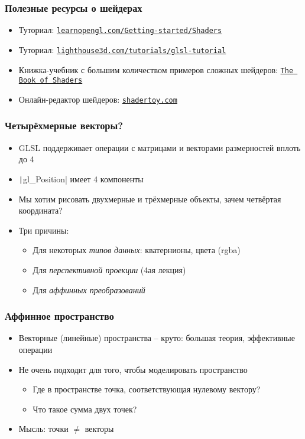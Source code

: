 \documentclass[10pt]{beamer}
\begin{document}
\begin{frame}[fragile]
\frametitle{Полезные ресурсы о шейдерах}
\begin{itemize}
\item Туториал: \href{https://learnopengl.com/Getting-started/Shaders}{\nolinkurl{learnopengl.com/Getting-started/Shaders}}
\item Туториал: \href{https://www.lighthouse3d.com/tutorials/glsl-tutorial}{\nolinkurl{lighthouse3d.com/tutorials/glsl-tutorial}}
\pause
\item Книжка-учебник с большим количеством примеров сложных шейдеров: \href{https://thebookofshaders.com/00/}{\texttt{The Book of Shaders}}
\pause
\item Онлайн-редактор шейдеров: \href{https://shadertoy.com/}{\nolinkurl{shadertoy.com}}
\end{itemize}
\end{frame}

\begin{frame}[fragile]
\frametitle{Четырёхмерные векторы?}
\begin{itemize}
\item GLSL поддерживает операции с матрицами и векторами размерностей вплоть до 4
\item \texttt|gl_Position| имеет 4 компоненты
\pause
\item Мы хотим рисовать двухмерные и трёхмерные объекты, зачем четвёртая координата?
\pause
\item Три причины:
\pause
\begin{itemize}
\item Для некоторых \textit{типов данных}: кватернионы, цвета (rgba)
\pause
\item Для \textit{перспективной проекции} (4ая лекция)
\pause
\item Для \textit{аффинных преобразований}
\end{itemize}
\end{itemize}
\end{frame}

\begin{frame}[fragile]
\frametitle{Аффинное пространство}
\begin{itemize}
\item Векторные (линейные) пространства -- круто: большая теория, эффективные операции
\pause
\item Не очень подходит для того, чтобы моделировать пространство
\pause
\begin{itemize}
\item Где в пространстве точка, соответствующая нулевому вектору?
\pause
\item Что такое сумма двух точек?
\end{itemize}
\pause
\item Мысль: точки \begin{math}\neq\end{math} векторы
\end{itemize}
\end{frame}
\end{document}
